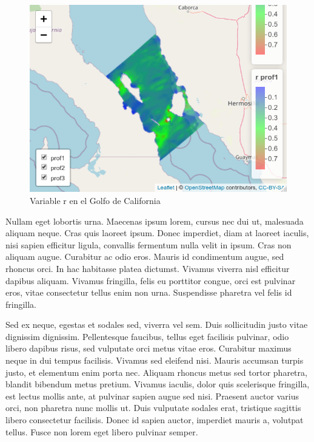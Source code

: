 \documentclass[
]{article}
\begin{document}
\begin{figure}
\includegraphics[width=0.95\linewidth]{images/golfocalif01} \caption{Variable r en el Golfo de California}\label{fig:Mapa05}
\end{figure}

Nullam eget lobortis urna. Maecenas ipsum lorem, cursus nec dui ut, malesuada aliquam neque. Cras quis laoreet ipsum. Donec imperdiet, diam at laoreet iaculis, nisi sapien efficitur ligula, convallis fermentum nulla velit in ipsum. Cras non aliquam augue. Curabitur ac odio eros. Mauris id condimentum augue, sed rhoncus orci. In hac habitasse platea dictumst. Vivamus viverra nisl efficitur dapibus aliquam. Vivamus fringilla, felis eu porttitor congue, orci est pulvinar eros, vitae consectetur tellus enim non urna. Suspendisse pharetra vel felis id fringilla.

Sed ex neque, egestas et sodales sed, viverra vel sem. Duis sollicitudin justo vitae dignissim dignissim. Pellentesque faucibus, tellus eget facilisis pulvinar, odio libero dapibus risus, sed vulputate orci metus vitae eros. Curabitur maximus neque in dui tempus facilisis. Vivamus sed eleifend nisi. Mauris accumsan turpis justo, et elementum enim porta nec. Aliquam rhoncus metus sed tortor pharetra, blandit bibendum metus pretium. Vivamus iaculis, dolor quis scelerisque fringilla, est lectus mollis ante, at pulvinar sapien augue sed nisi. Praesent auctor varius orci, non pharetra nunc mollis ut. Duis vulputate sodales erat, tristique sagittis libero consectetur facilisis. Donec id sapien auctor, imperdiet mauris a, volutpat tellus. Fusce non lorem eget libero pulvinar semper.
\end{document}
